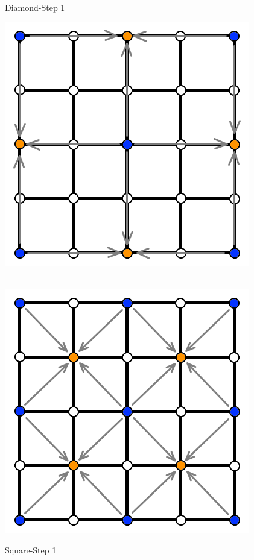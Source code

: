 \documentclass[11pt,a4paper,twoside,openright]{report}
\begin{document}
\begin{figure}[!htb]
  \caption{Diamond-Step 1}\label{fig:ds2}
\endminipage
{}%
  \includegraphics[width=\linewidth]{ds3.png}
  \caption{Square-Step 1}\label{fig:ds3}
\endminipage\hfill
\\
\centering
{}
  \includegraphics[width=\linewidth]{ds4.png}

\end{figure}
\end{document}
